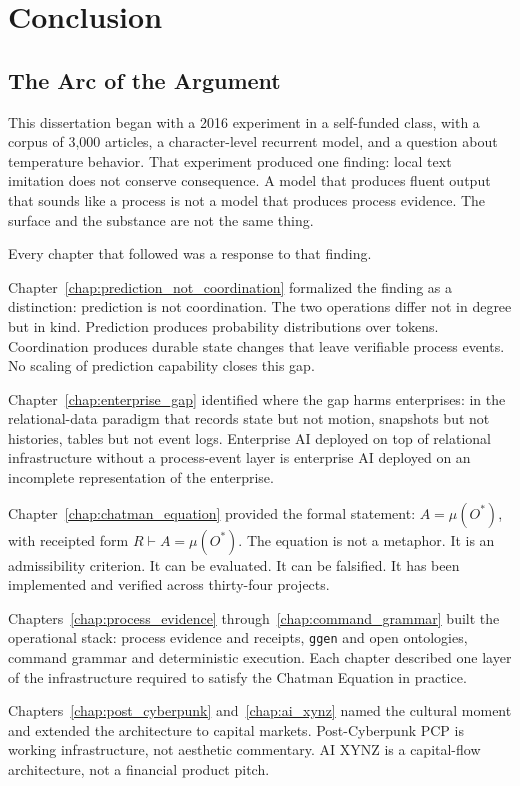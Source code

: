 \chapter{Conclusion}
\label{chap:conclusion}

\section{The Arc of the Argument}

This dissertation began with a 2016 experiment in a self-funded class, with a corpus of 3,000 articles, a character-level recurrent model, and a question about temperature behavior. That experiment produced one finding: local text imitation does not conserve consequence. A model that produces fluent output that sounds like a process is not a model that produces process evidence. The surface and the substance are not the same thing.

Every chapter that followed was a response to that finding.

Chapter~\ref{chap:prediction_not_coordination} formalized the finding as a distinction: prediction is not coordination. The two operations differ not in degree but in kind. Prediction produces probability distributions over tokens. Coordination produces durable state changes that leave verifiable process events. No scaling of prediction capability closes this gap.

Chapter~\ref{chap:enterprise_gap} identified where the gap harms enterprises: in the relational-data paradigm that records state but not motion, snapshots but not histories, tables but not event logs. Enterprise AI deployed on top of relational infrastructure without a process-event layer is enterprise AI deployed on an incomplete representation of the enterprise.

Chapter~\ref{chap:chatman_equation} provided the formal statement: $A = \mu(O^{*})$, with receipted form $R \vdash A = \mu(O^{*})$. The equation is not a metaphor. It is an admissibility criterion. It can be evaluated. It can be falsified. It has been implemented and verified across thirty-four projects.

Chapters~\ref{chap:process_evidence} through~\ref{chap:command_grammar} built the operational stack: process evidence and receipts, \texttt{ggen} and open ontologies, command grammar and deterministic execution. Each chapter described one layer of the infrastructure required to satisfy the Chatman Equation in practice.

Chapters~\ref{chap:post_cyberpunk} and~\ref{chap:ai_xynz} named the cultural moment and extended the architecture to capital markets. Post-Cyberpunk PCP is working infrastructure, not aesthetic commentary. AI XYNZ is a capital-flow architecture, not a financial product pitch.

